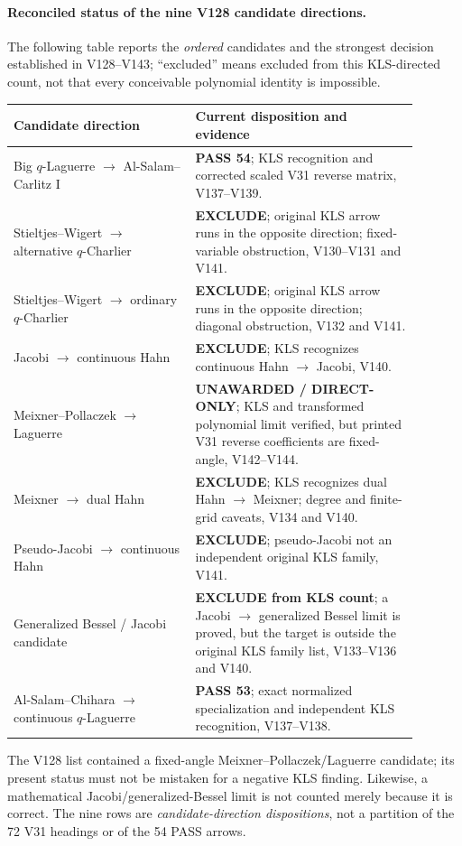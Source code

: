 \documentclass[11pt]{article}
\begin{document}
\paragraph{Reconciled status of the nine V128 candidate directions.}
The following table reports the \emph{ordered} candidates and the strongest decision established in V128--V143; ``excluded'' means excluded from this KLS-directed count, not that every conceivable polynomial identity is impossible.
\begin{center}\small
\begin{tabular}{p{0.40\linewidth}p{0.49\linewidth}}
\hline
Candidate direction & Current disposition and evidence \\
\hline
Big $q$-Laguerre $\to$ Al-Salam--Carlitz I & \textbf{PASS 54}; KLS recognition and corrected scaled V31 reverse matrix, V137--V139.\\
Stieltjes--Wigert $\to$ alternative $q$-Charlier & \textbf{EXCLUDE}; original KLS arrow runs in the opposite direction; fixed-variable obstruction, V130--V131 and V141.\\
Stieltjes--Wigert $\to$ ordinary $q$-Charlier & \textbf{EXCLUDE}; original KLS arrow runs in the opposite direction; diagonal obstruction, V132 and V141.\\
Jacobi $\to$ continuous Hahn & \textbf{EXCLUDE}; KLS recognizes continuous Hahn $\to$ Jacobi, V140.\\
Meixner--Pollaczek $\to$ Laguerre & \textbf{UNAWARDED / DIRECT-ONLY}; KLS and transformed polynomial limit verified, but printed V31 reverse coefficients are fixed-angle, V142--V144.\\
Meixner $\to$ dual Hahn & \textbf{EXCLUDE}; KLS recognizes dual Hahn $\to$ Meixner; degree and finite-grid caveats, V134 and V140.\\
Pseudo-Jacobi $\to$ continuous Hahn & \textbf{EXCLUDE}; pseudo-Jacobi not an independent original KLS family, V141.\\
Generalized Bessel / Jacobi candidate & \textbf{EXCLUDE from KLS count}; a Jacobi $\to$ generalized Bessel limit is proved, but the target is outside the original KLS family list, V133--V136 and V140.\\
Al-Salam--Chihara $\to$ continuous $q$-Laguerre & \textbf{PASS 53}; exact normalized specialization and independent KLS recognition, V137--V138.\\
\hline
\end{tabular}
\end{center}
\noindent The V128 list contained a fixed-angle Meixner--Pollaczek/Laguerre candidate; its present status must not be mistaken for a negative KLS finding. Likewise, a mathematical Jacobi/generalized-Bessel limit is not counted merely because it is correct. The nine rows are \emph{candidate-direction dispositions}, not a partition of the 72 V31 headings or of the 54 PASS arrows.
\end{document}
